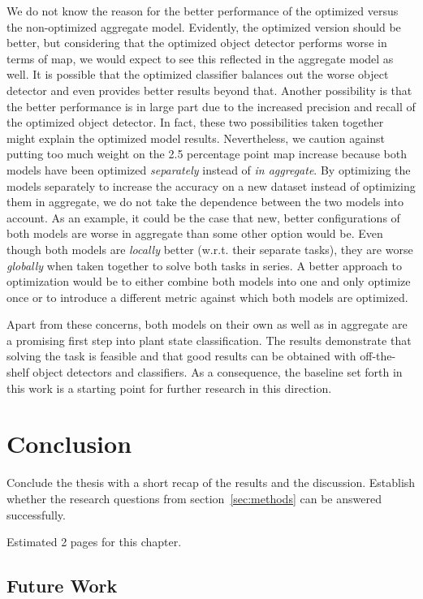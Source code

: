 \documentclass[draft,final]{vutinfth} %
\begin{document}
We do not know the reason for the better performance of the optimized
versus the non-optimized aggregate model. Evidently, the optimized
version should be better, but considering that the optimized object
detector performs worse in terms of \gls{map}, we would expect to see
this reflected in the aggregate model as well. It is possible that the
optimized classifier balances out the worse object detector and even
provides better results beyond that. Another possibility is that the
better performance is in large part due to the increased precision and
recall of the optimized object detector. In fact, these two
possibilities taken together might explain the optimized model
results. Nevertheless, we caution against putting too much weight on
the \num{2.5} percentage point \gls{map} increase because both models
have been optimized \emph{separately} instead of \emph{in
aggregate}. By optimizing the models separately to increase the
accuracy on a new dataset instead of optimizing them in aggregate, we
do not take the dependence between the two models into account. As an
example, it could be the case that new, better configurations of both
models are worse in aggregate than some other option would be. Even
though both models are \emph{locally} better (w.r.t. their separate
tasks), they are worse \emph{globally} when taken together to solve
both tasks in series. A better approach to optimization would be to
either combine both models into one and only optimize once or to
introduce a different metric against which both models are optimized.

Apart from these concerns, both models on their own as well as in
aggregate are a promising first step into plant state
classification. The results demonstrate that solving the task is
feasible and that good results can be obtained with off-the-shelf
object detectors and classifiers. As a consequence, the baseline set
forth in this work is a starting point for further research in this
direction.

\chapter{Conclusion}
\label{chap:conclusion}

Conclude the thesis with a short recap of the results and the
discussion. Establish whether the research questions from
section~\ref{sec:methods} can be answered successfully.

Estimated 2 pages for this chapter.

\section{Future Work}
\label{sec:future-work}
\end{document}
